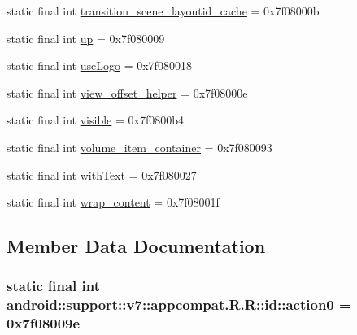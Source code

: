 \begin{CompactItemize}
\item 
static final int \hyperlink{classandroid_1_1support_1_1v7_1_1appcompat_1_1_r_1_1id_d3655cba6bb09a652a5c7d7239d29c12}{transition\_\-scene\_\-layoutid\_\-cache} = 0x7f08000b
\item 
static final int \hyperlink{classandroid_1_1support_1_1v7_1_1appcompat_1_1_r_1_1id_b2185511144c362f1446c9892507c6ff}{up} = 0x7f080009
\item 
static final int \hyperlink{classandroid_1_1support_1_1v7_1_1appcompat_1_1_r_1_1id_0559cd4625d835ed7dd6a317e1e43456}{useLogo} = 0x7f080018
\item 
static final int \hyperlink{classandroid_1_1support_1_1v7_1_1appcompat_1_1_r_1_1id_0af6897aef6f1c55d08f7efd4bf9ce22}{view\_\-offset\_\-helper} = 0x7f08000e
\item 
static final int \hyperlink{classandroid_1_1support_1_1v7_1_1appcompat_1_1_r_1_1id_8a6adf76f51fcfce9ecf0664d28238a1}{visible} = 0x7f0800b4
\item 
static final int \hyperlink{classandroid_1_1support_1_1v7_1_1appcompat_1_1_r_1_1id_a8c74328fa7b241a4cf3d64c962a6b90}{volume\_\-item\_\-container} = 0x7f080093
\item 
static final int \hyperlink{classandroid_1_1support_1_1v7_1_1appcompat_1_1_r_1_1id_3d300fb4a805bb784dafb5e229edcd0f}{withText} = 0x7f080027
\item 
static final int \hyperlink{classandroid_1_1support_1_1v7_1_1appcompat_1_1_r_1_1id_eccc4f04e50072fcbb2b7f4b0017cb93}{wrap\_\-content} = 0x7f08001f
\end{CompactItemize}


\subsection{Member Data Documentation}
\hypertarget{classandroid_1_1support_1_1v7_1_1appcompat_1_1_r_1_1id_e5f0b2be7d0d3e1e754e8daddd7e68d9}{
\subsubsection[{action0}]{\setlength{\rightskip}{0pt plus 5cm}static final int android::support::v7::appcompat.R.R::id::action0 = 0x7f08009e}}
\label{classandroid_1_1support_1_1v7_1_1appcompat_1_1_r_1_1id_e5f0b2be7d0d3e1e754e8daddd7e68d9}


